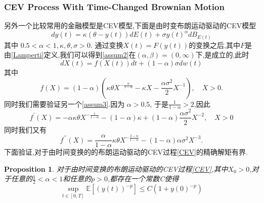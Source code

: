 \documentclass[12pt,final]{article}
\theoremstyle{plain}
\newtheorem{Proposition}[Theorem]{Proposition} %
\theoremstyle{Definition}
\theoremstyle{Remark}
\begin{document}
	\subsubsection{CEV Process With Time-Changed Brownian Motion}
	另外一个比较常用的金融模型是CEV模型,下面是由时变布朗运动驱动的CEV模型
	\begin{equation}\label{CEV}
		dy(t)=\kappa(\theta-y(t))dE(t)+\sigma y(t)^\alpha dB_{E(t)}
	\end{equation}
	其中 $0.5<\alpha<1,\kappa,\theta,\sigma>0.$ 通过变换$X(t)=F(y(t))$的变换之后,其中$F$是由\cref{Lamperti}定义,我们可以得到\cref{assum2}在$(\alpha,\beta)=(0,\infty)$下,是成立的,此时	$$dX(t)=f(X(t))dt+(1-\alpha)\sigma dw(t)$$
	其中
	$$f(X)=(1-\alpha)\left(\kappa\theta X^{-\frac\alpha{1-\alpha}}-\kappa X-\frac{\alpha\sigma^2}2X^{-1}\right),\quad X>0.$$
	同时我们需要验证另一个\cref{assum3}.因为 $\alpha>0.5$, 于是$\frac{1}{1-\alpha}>2$,因此
	$$f^{\prime}(X)=-\alpha\kappa\theta X^{-\frac1{1-\alpha}}-(1-\alpha)\kappa+(1-\alpha)\frac{\alpha\sigma^2}2X^{-2},\quad X>0$$
	同时我们又有
	$$f^{\prime\prime}(X)=\frac\alpha{1-\alpha}\kappa\theta X^{-\frac{2-\alpha}{1-\alpha}}-(1-\alpha)\alpha\sigma^2X^{-3}.$$
	下面验证,对于由时间变换的的布朗运动驱动的CEV过程\cref{CEV}的精确解矩有界.
	\begin{Proposition}
		对于由时间变换的布朗运动驱动的CEV过程\cref{CEV},其中$X_0>0$,对于任意的$\frac{1}{2}<\alpha<1$和任意的$p>0$,都存在一个常数C使得
		\begin{equation*}
			\sup\limits_{t\in[0,T]}\mathbb{E}\left[\left(y(t)\right)^{-p}\right]\leq C(1+y(0)^{-p})
		\end{equation*}
	\end{Proposition}
\end{document}

